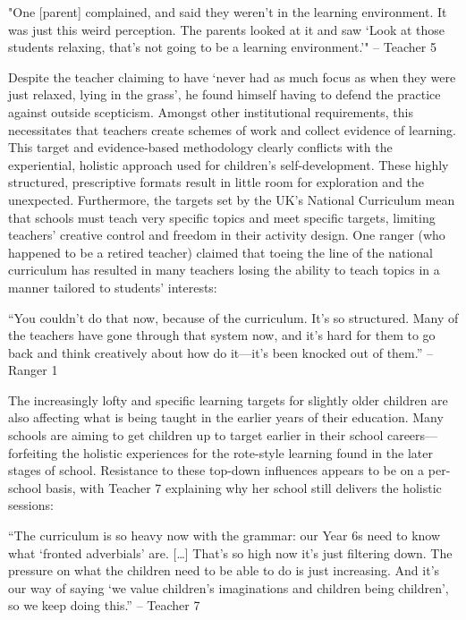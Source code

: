 \begin{displayquote}
"One [parent] complained, and said they weren't in the learning environment. It was just this weird perception. The parents looked at it and saw `Look at those students relaxing, that’s not going to be a learning environment.'" – Teacher 5
\end{displayquote}

Despite the teacher claiming to have `never had as much focus as when they were just relaxed, lying in the grass', he found himself having to defend the practice against outside scepticism. Amongst other institutional requirements, this necessitates that teachers create schemes of work and collect evidence of learning. This target and evidence-based methodology clearly conflicts with the experiential, holistic approach used for children’s self-development. These highly structured, prescriptive formats result in little room for exploration and the unexpected. Furthermore, the targets set by the UK’s National Curriculum mean that schools must teach very specific topics and meet specific targets, limiting teachers’ creative control and freedom in their activity design. One ranger (who happened to be a retired teacher) claimed that toeing the line of the national curriculum has resulted in many teachers losing the ability to teach topics in a manner tailored to students’ interests:

\begin{displayquote}
“You couldn't do that now, because of the curriculum. It’s so structured. Many of the teachers have gone through that system now, and it’s hard for them to go back and think creatively about how do it---it’s been knocked out of them.” – Ranger 1
\end{displayquote}

The increasingly lofty and specific learning targets for slightly older children are also affecting what is being taught in the earlier years of their education. Many schools are aiming to get children up to target earlier in their school careers---forfeiting the holistic experiences for the rote-style learning found in the later stages of school. Resistance to these top-down influences appears to be on a per-school basis, with Teacher 7 explaining why her school still delivers the holistic sessions:

\begin{displayquote}
“The curriculum is so heavy now with the grammar: our Year 6s need to know what `fronted adverbials' are. […] That's so high now it’s just filtering down. The pressure on what the children need to be able to do is just increasing. And it's our way of saying `we value children’s imaginations and children being children', so we keep doing this.” – Teacher 7 
\end{displayquote}

